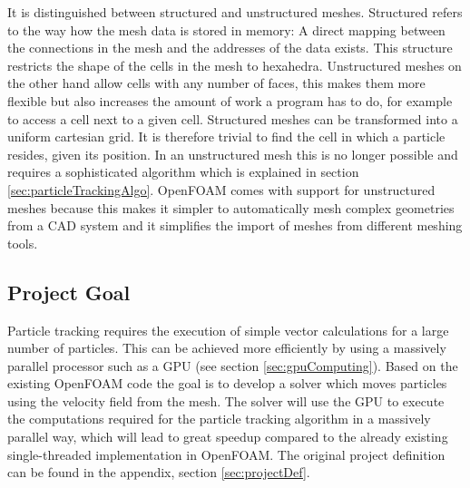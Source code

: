 It is distinguished between structured and unstructured meshes. Structured refers to the way how the mesh data is stored in memory: A direct mapping between the connections in the mesh and the addresses of the data exists. This structure restricts the shape of the cells in the mesh to hexahedra. Unstructured meshes on the other hand allow cells with any number of faces, this makes them more flexible but also increases the amount of work a program has to do, for example to access a cell next to a given cell. Structured meshes can be transformed into a uniform cartesian grid. \cite{innovativeCFDGrid} It is therefore trivial to find the cell in which a particle resides, given its position. In an unstructured mesh this is no longer possible and requires a sophisticated algorithm which is explained in section \ref{sec:particleTrackingAlgo}. OpenFOAM comes with support for unstructured meshes because this makes it simpler to automatically mesh complex geometries from a CAD system and it simplifies the import of meshes from different meshing tools. \cite{jasakMeshHandling}

\subsection{Project Goal}

Particle tracking requires the execution of simple vector calculations for a large number of particles. This can be achieved more efficiently by using a massively parallel processor such as a GPU (see section \ref{sec:gpuComputing}).
Based on the existing OpenFOAM code the goal is to develop a solver which moves particles using the velocity field from the mesh. The solver will use the GPU to execute the computations required for the particle tracking algorithm in a massively parallel way, which will lead to great speedup compared to the already existing single-threaded implementation in OpenFOAM. The original project definition can be found in the appendix, section \ref{sec:projectDef}.
